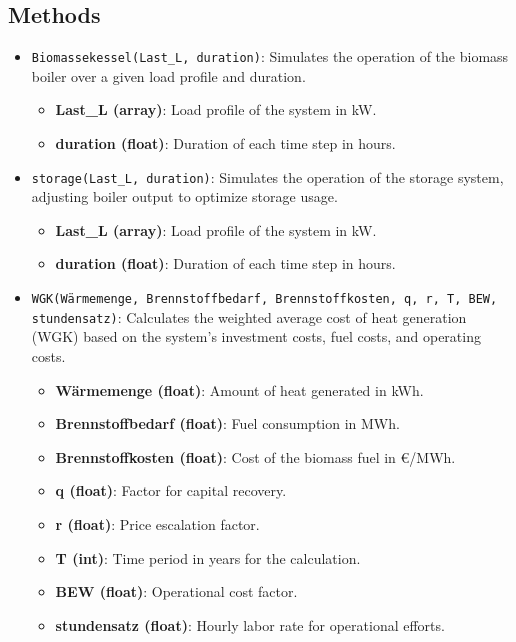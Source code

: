 \subsection{Methods}
\begin{itemize}
    \item \texttt{Biomassekessel(Last\_L, duration)}: Simulates the operation of the biomass boiler over a given load profile and duration.
    \begin{itemize}
        \item \textbf{Last\_L (array)}: Load profile of the system in kW.
        \item \textbf{duration (float)}: Duration of each time step in hours.
    \end{itemize}
    
    \item \texttt{storage(Last\_L, duration)}: Simulates the operation of the storage system, adjusting boiler output to optimize storage usage.
    \begin{itemize}
        \item \textbf{Last\_L (array)}: Load profile of the system in kW.
        \item \textbf{duration (float)}: Duration of each time step in hours.
    \end{itemize}

    \item \texttt{WGK(Wärmemenge, Brennstoffbedarf, Brennstoffkosten, q, r, T, BEW, stundensatz)}: Calculates the weighted average cost of heat generation (WGK) based on the system's investment costs, fuel costs, and operating costs.
    \begin{itemize}
        \item \textbf{Wärmemenge (float)}: Amount of heat generated in kWh.
        \item \textbf{Brennstoffbedarf (float)}: Fuel consumption in MWh.
        \item \textbf{Brennstoffkosten (float)}: Cost of the biomass fuel in €/MWh.
        \item \textbf{q (float)}: Factor for capital recovery.
        \item \textbf{r (float)}: Price escalation factor.
        \item \textbf{T (int)}: Time period in years for the calculation.
        \item \textbf{BEW (float)}: Operational cost factor.
        \item \textbf{stundensatz (float)}: Hourly labor rate for operational efforts.
    \end{itemize}


\end{itemize}
